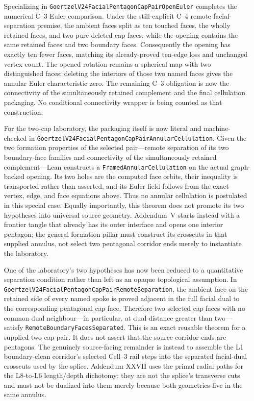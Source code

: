 \documentclass[11pt]{article}
\theoremstyle{definition}
\begin{document}
Specializing in
\texttt{GoertzelV24FacialPentagonCapPairOpenEuler} completes the numerical
C--3 Euler comparison.  Under the still-explicit C--4 remote facial-separation
premise, the ambient faces split as ten touched faces, the wholly retained
faces, and two pure deleted cap faces, while the opening contains the same
retained faces and two boundary faces.  Consequently the opening has exactly
ten fewer faces, matching its already-proved ten-edge loss and unchanged
vertex count.  The opened rotation remains a spherical map with two
distinguished faces; deleting the interiors of those two named faces gives
the annular Euler characteristic zero.  The remaining C--3 obligation is now
the connectivity of the simultaneously retained complement and the final
cellulation packaging.  No conditional connectivity wrapper is being counted
as that construction.

For the two-cap laboratory, the packaging itself is now literal and machine-checked in
\texttt{GoertzelV24FacialPentagonCapPairAnnularCellulation}.  Given the two
formation properties of the selected pair---remote separation of its two
boundary-face families and connectivity of the simultaneously retained
complement---Lean constructs a \texttt{FramedAnnularCellulation} on the actual
graph-backed opening.  Its two holes are the computed face orbits, their
inequality is transported rather than asserted, and its Euler field follows
from the exact vertex, edge, and face equations above.  Thus no annular
cellulation is postulated in this special case.  Equally importantly, this
theorem does not promote its two hypotheses into universal source geometry.
Addendum~V starts instead with a frontier tangle that already has its outer
interface and opens one interior pentagon; the general formation pillar must
construct its crosscuts in that supplied annulus, not select two pentagonal
corridor ends merely to instantiate the laboratory.

One of the laboratory's two hypotheses has now been reduced to a quantitative
separation condition rather than left as an opaque topological assumption.
In \texttt{GoertzelV24FacialPentagonCapPairRemoteSeparation}, the ambient face
on the retained side of every named spoke is proved adjacent in the full
facial dual to the corresponding pentagonal cap face.  Therefore two selected
cap faces with no common dual neighbour---in particular, at dual distance
greater than two---satisfy \texttt{RemoteBoundaryFacesSeparated}.  This is an
exact reusable theorem for a supplied two-cap pair.  It does not assert that
the source corridor ends are pentagons.  The genuinely source-facing remainder
is instead to assemble the L1 boundary-clean corridor's selected Cell--3 rail
steps into the separated facial-dual crosscuts used by the splice.  Addendum
XXVII uses the primal radial paths for the L8-to-L6 length/depth dichotomy;
they are not the splice's transverse cuts and must not be dualized into them merely
because both geometries live in the same annulus.
\end{document}
